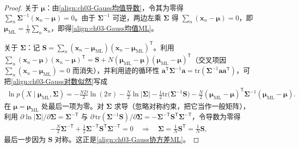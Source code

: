 \documentclass[../../main.tex]{subfiles}
\begin{document}
\begin{proof}
关于 $\boldsymbol{\mu}$：由\eqref{align:ch03-Gauss均值导数}，令其为零得 $\sum_n\boldsymbol{\Sigma}^{-1}(\boldsymbol{x}_n-\boldsymbol{\mu})=0$。由于 $\boldsymbol{\Sigma}^{-1}$ 可逆，两边左乘 $\boldsymbol{\Sigma}$ 得 $\sum_n(\boldsymbol{x}_n-\boldsymbol{\mu})=0$，即 $\boldsymbol{\mu}_{\mathrm{ML}}=\frac{1}{N}\sum_n\boldsymbol{x}_n$，即得\eqref{align:ch03-Gauss均值ML}。

关于 $\boldsymbol{\Sigma}$：记 $\boldsymbol{S}=\sum_n(\boldsymbol{x}_n-\boldsymbol{\mu}_{\mathrm{ML}})(\boldsymbol{x}_n-\boldsymbol{\mu}_{\mathrm{ML}})^{\mathsf{T}}$。利用 $\sum_n(\boldsymbol{x}_n-\boldsymbol{\mu})(\boldsymbol{x}_n-\boldsymbol{\mu})^{\mathsf{T}}=\boldsymbol{S}+N(\boldsymbol{\mu}_{\mathrm{ML}}-\boldsymbol{\mu})(\boldsymbol{\mu}_{\mathrm{ML}}-\boldsymbol{\mu})^{\mathsf{T}}$（交叉项因 $\sum_n(\boldsymbol{x}_n-\boldsymbol{\mu}_{\mathrm{ML}})=0$ 而消失），并利用迹的循环性 $\boldsymbol{a}^{\mathsf{T}}\boldsymbol{\Sigma}^{-1}\boldsymbol{a}=\mathrm{tr}(\boldsymbol{\Sigma}^{-1}\boldsymbol{a}\boldsymbol{a}^{\mathsf{T}})$，可把\eqref{align:ch03-Gauss对数似然}写成
\begin{align*}
\ln p(X\mid\boldsymbol{\mu}_{\mathrm{ML}},\boldsymbol{\Sigma})=-\frac{ND}{2}\ln(2\pi)-\frac{N}{2}\ln\lvert\boldsymbol{\Sigma}\rvert-\frac{1}{2}\mathrm{tr}\bigl(\boldsymbol{\Sigma}^{-1}\boldsymbol{S}\bigr)-\frac{N}{2}(\boldsymbol{\mu}_{\mathrm{ML}}-\boldsymbol{\mu})^{\mathsf{T}}\boldsymbol{\Sigma}^{-1}(\boldsymbol{\mu}_{\mathrm{ML}}-\boldsymbol{\mu}).
\end{align*}
在 $\boldsymbol{\mu}=\boldsymbol{\mu}_{\mathrm{ML}}$ 处最后一项为零。对 $\boldsymbol{\Sigma}$ 求导（忽略对称约束，把它当作一般矩阵），利用 $\partial\ln\lvert\boldsymbol{\Sigma}\rvert/\partial\boldsymbol{\Sigma}=\boldsymbol{\Sigma}^{-\mathsf{T}}$ 与 $\partial\,\mathrm{tr}(\boldsymbol{\Sigma}^{-1}\boldsymbol{S})/\partial\boldsymbol{\Sigma}=-\boldsymbol{\Sigma}^{-\mathsf{T}}\boldsymbol{S}^{\mathsf{T}}\boldsymbol{\Sigma}^{-\mathsf{T}}$，令导数为零得
\begin{align*}
-\frac{N}{2}\boldsymbol{\Sigma}^{-\mathsf{T}}+\frac{1}{2}\boldsymbol{\Sigma}^{-\mathsf{T}}\boldsymbol{S}^{\mathsf{T}}\boldsymbol{\Sigma}^{-\mathsf{T}}=0\quad\Longrightarrow\quad\boldsymbol{\Sigma}=\frac{1}{N}\boldsymbol{S}^{\mathsf{T}}=\frac{1}{N}\boldsymbol{S},
\end{align*}
最后一步因为 $\boldsymbol{S}$ 对称。这正是\eqref{align:ch03-Gauss协方差ML}。


\end{proof}
\end{document}
